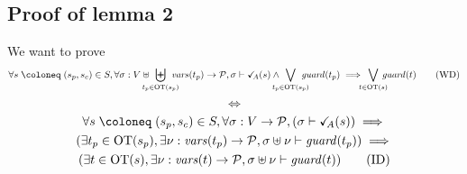 \documentclass{article}
\begin{document}
\subsection{Proof of lemma 2}
We want to prove
\[ \forall s \defobject \mpar{s_p, s_c} \in S, \forall \sigma: V \uplus \biguplus_\subbox{t_p \in \fOT{s_p}} \fvars{t_p} \to \values, \sigma \vdash \reach{A}\mpar{s} \wedge \bigvee_\subbox{t_p \in \fOT{s_p}} \fguard{t_p} \implies \bigvee_\subbox{t \in \fOT{s}} \fguard{t} \tag{WD}\label{eq:nlcWD} \]
\[ \iff \]
\begin{multline*}
	\forall s \defobject \mpar{s_p, s_c} \in S, \forall \sigma: V \to \values, \mpar{\sigma \vdash \reach{A}\mpar{s}} \implies \\
	\mpar{\exists t_p \in \fOT{s_p}, \exists \nu: \fvars{t_p} \to \values, \sigma \uplus \nu \vdash \fguard{t_p}} \implies \\
	\mpar{\exists t \in \fOT{s}, \exists \nu: \fvars{t} \to \values, \sigma \uplus \nu \vdash \fguard{t}} \tag{ID}\label{eq:nlcID}
\end{multline*}
\end{document}
